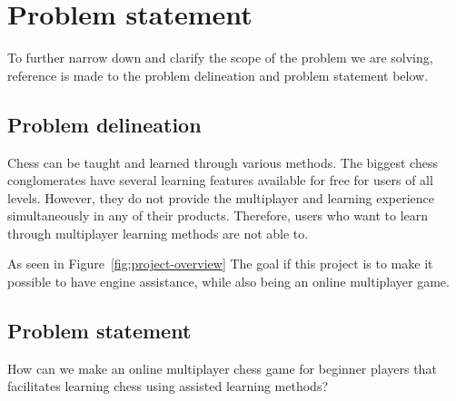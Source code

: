\chapter{Problem statement}\label{ch:problem-statement}

To further narrow down and clarify the scope of the problem we are solving, reference is made to the problem delineation
and problem statement below.



\section{Problem delineation}\label{sec:problem-delineation}

Chess can be taught and learned through various methods.
The biggest chess conglomerates have several learning features available for free for users of all levels.
However, they do not provide the multiplayer and learning experience simultaneously in any of their products.
Therefore, users who want to learn through multiplayer learning methods are not able to.

As seen in Figure~\ref{fig:project-overview} The goal if this project is to make it possible to have engine
assistance, while also being an online multiplayer game.



\section{Problem statement}\label{sec:problem-statement}

\begin{tcolorbox}
    How can we make an online multiplayer chess game for beginner players that facilitates learning chess using
    assisted learning methods?
\end{tcolorbox}
